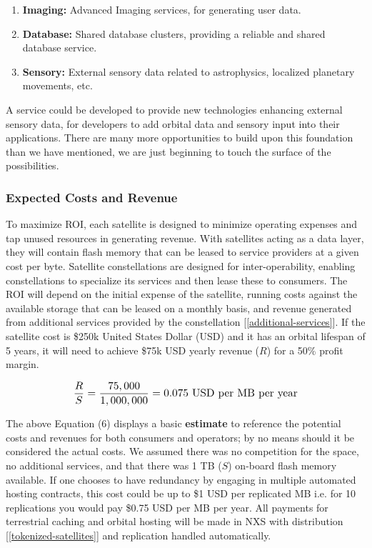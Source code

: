 \documentclass[11pt]{article}
\begin{document}
\begin{enumerate}
    \item \textbf{Imaging:} Advanced Imaging services, for generating user data.
    \item \textbf{Database:} Shared database clusters, providing a reliable and shared database service.
    \item \textbf{Sensory:} External sensory data related to astrophysics, localized planetary movements, etc.
\end{enumerate}

\noindent A service could be developed to provide new technologies enhancing external sensory data, for developers to add orbital data and sensory input into their applications.
There are many more opportunities to build upon this foundation than we have mentioned, we are just beginning to touch the surface of the possibilities.


\subsubsection{Expected Costs and Revenue}
\label{satellite-revenue}

\noindent To maximize ROI, each satellite is designed to minimize operating expenses and tap unused resources in generating revenue.
With satellites acting as a data layer, they will contain flash memory that can be leased to service providers at a given cost per byte.
Satellite constellations are designed for inter-operability, enabling constellations to specialize its services and then lease these to consumers.
The ROI will depend on the initial expense of the satellite, running costs against the available storage that can be leased on a monthly basis, and revenue generated from additional services provided by the constellation [\ref{additional-services}].
If the satellite cost is \$250k United States Dollar (USD) and it has an orbital lifespan of 5 years, it will need to achieve \$75k USD yearly revenue ($R$) for a 50\% profit margin.

\begin{equation}
\resizebox{.65\hsize}{!}{$\mathlarger{\frac{R}{S}} = \mathlarger{\frac{75,000}{1,000,000}} = 0.075$ USD per MB per year}
\end{equation}
\bigskip

\noindent The above Equation (6) displays a basic \textbf{estimate} to reference the potential costs and revenues for both consumers and operators; by no means should it be considered the actual costs.
We assumed there was no competition for the space, no additional services, and that there was 1 TB ($S$) on-board flash memory available.
If one chooses to have redundancy by engaging in multiple automated hosting contracts, this cost could be up to \$1 USD per replicated MB i.e. for 10 replications you would pay \$0.75 USD per MB per year.
All payments for terrestrial caching and orbital hosting will be made in NXS with distribution [\ref{tokenized-satellites}] and replication handled automatically.
\end{document}
